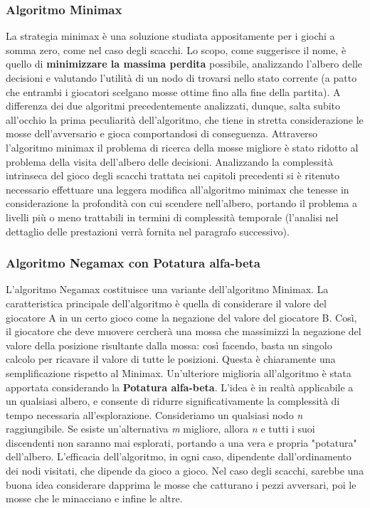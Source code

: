 \subsubsection{Algoritmo Minimax}
La strategia minimax è una soluzione studiata appositamente per i giochi a somma zero, come nel caso degli scacchi. Lo scopo, come suggerisce il nome, è quello di \textbf{minimizzare la massima perdita} possibile, analizzando l'albero delle decisioni e valutando l'utilità di un nodo di trovarsi nello stato corrente (a patto che entrambi i giocatori scelgano mosse ottime fino alla fine della partita). A differenza dei due algoritmi precedentemente analizzati, dunque, salta subito all'occhio la prima peculiarità dell'algoritmo, che tiene in stretta considerazione le mosse dell'avversario e gioca comportandosi di conseguenza. Attraverso l'algoritmo minimax il problema di ricerca della mosse migliore è stato ridotto al problema della visita dell'albero delle decisioni. Analizzando la complessità intrinseca del gioco degli scacchi trattata nei capitoli precedenti si è ritenuto necessario effettuare una leggera modifica all'algoritmo minimax che tenesse in considerazione la profondità con cui scendere nell'albero, portando il problema a livelli più o meno trattabili in termini di complessità temporale (l'analisi nel dettaglio delle prestazioni verrà fornita nel paragrafo successivo).
\subsubsection{Algoritmo Negamax con Potatura alfa-beta}
L'algoritmo Negamax costituisce una variante dell'algoritmo Minimax. La caratteristica principale dell'algoritmo è quella di considerare il valore del giocatore A in un certo gioco come la negazione del valore del giocatore B. Così, il giocatore che deve muovere cercherà una mossa che massimizzi la negazione del valore della posizione risultante dalla mossa: così facendo, basta un singolo calcolo per ricavare il valore di tutte le posizioni. Questa è chiaramente una semplificazione rispetto al Minimax. Un'ulteriore miglioria all'algoritmo è stata apportata considerando la \textbf{Potatura alfa-beta}. L'idea è in realtà applicabile a un qualsiasi albero, e consente di ridurre significativamente la complessità di tempo necessaria all'esplorazione. Consideriamo un qualsiasi nodo \textit{n} raggiungibile. Se esiste un'alternativa \textit{m} migliore, allora \textit{n} e tutti i suoi discendenti non saranno mai esplorati, portando a una vera e propria "potatura" dell'albero. L'efficacia dell'algoritmo, in ogni caso, dipendente dall'ordinamento dei nodi visitati, che dipende da gioco a gioco. Nel caso degli scacchi, sarebbe una buona idea considerare dapprima le mosse che catturano i pezzi avversari, poi le mosse che le minacciano e infine le altre. 

